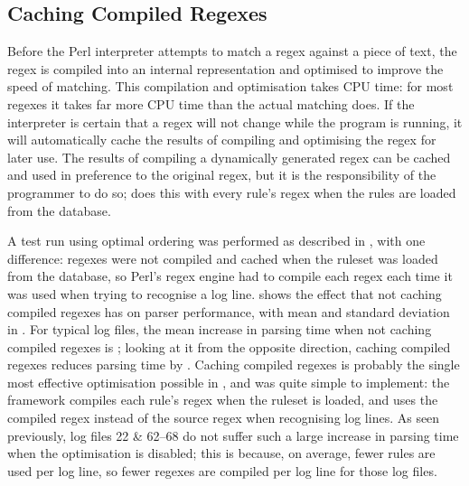 \FloatBarrier{}

\subsection{Caching Compiled Regexes}

\label{Caching compiled regexes}

Before the Perl interpreter attempts to match a regex against a piece of
text, the regex is compiled into an internal representation and optimised
to improve the speed of matching.  This compilation and optimisation takes
CPU time: for most regexes it takes far more CPU time than the actual
matching does.  If the interpreter is certain that a regex will not change
while the program is running, it will automatically cache the results of
compiling and optimising the regex for later use.  The results of compiling
a dynamically generated regex can be cached and used in preference to the
original regex, but it is the responsibility of the programmer to do so;
\parsername{} does this with every rule's regex when the rules are loaded
from the database.

A test run using optimal ordering was performed as described in
, with one difference: regexes were not
compiled and cached when the ruleset was loaded from the database, so
Perl's regex engine had to compile each regex each time it was used when
trying to recognise a log line.   shows the effect that not
caching compiled regexes has on parser performance, with mean and standard
deviation in .  For typical log files, the mean increase in
parsing time when not caching compiled regexes is
; looking at
it from the opposite direction, caching compiled regexes reduces parsing
time by
.
Caching compiled regexes is probably the single most effective optimisation
possible in \parsername{}, and was quite simple to implement: the framework
compiles each rule's regex when the ruleset is loaded, and uses the
compiled regex instead of the source regex when recognising log lines.  As
seen previously, log files 22 \& 62--68 do not suffer such a large increase
in parsing time when the optimisation is disabled; this is because, on
average, fewer rules are used per log line, so fewer regexes are compiled
per log line for those log files.

